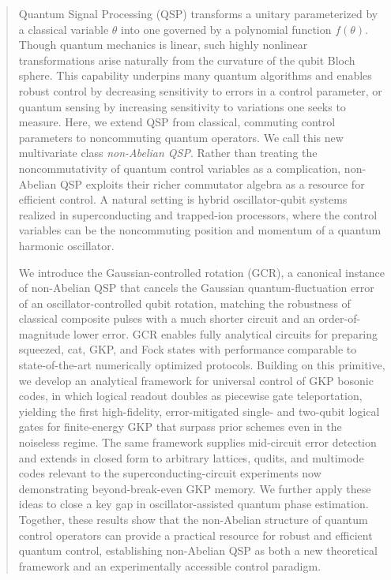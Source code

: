 \documentclass[aps,prx,showpacs,notitlepage,twocolumn,superscriptaddress,nofootinbib,preprintnumbers,floatfix,10pt, longbibliography]{revtex4-2}
\begin{document}
\begin{abstract}
Quantum Signal Processing (QSP) transforms a unitary parameterized by a classical variable $\theta$ into one governed by a polynomial function $f(\theta)$. Though quantum mechanics is linear, such highly nonlinear transformations arise naturally from the curvature of the qubit Bloch sphere. This capability underpins many quantum algorithms and enables robust control by decreasing sensitivity to errors in a control parameter, or quantum sensing by increasing sensitivity to variations one seeks to measure. Here, we extend QSP from classical, commuting control parameters to noncommuting quantum operators. We call this new multivariate class \emph{non-Abelian QSP}. Rather than treating the noncommutativity of quantum control variables as a complication, non-Abelian QSP exploits their richer commutator algebra as a resource for efficient control. A natural setting is hybrid oscillator-qubit systems realized in superconducting and trapped-ion processors, where the control variables can be the noncommuting position and momentum of a quantum harmonic oscillator. 

We introduce the Gaussian-controlled rotation (GCR), a canonical instance of non-Abelian QSP that cancels the Gaussian quantum-fluctuation error of an oscillator-controlled qubit rotation, matching the robustness of classical composite pulses with a much shorter circuit and an order-of-magnitude lower error. GCR enables fully analytical circuits for preparing squeezed, cat, GKP, and Fock states with performance comparable to state-of-the-art numerically optimized protocols. Building on this primitive, we develop an analytical framework for universal control of GKP bosonic codes, in which logical readout doubles as piecewise gate teleportation, yielding the first high-fidelity, error-mitigated single- and two-qubit logical gates for finite-energy GKP that surpass prior schemes even in the noiseless regime. The same framework supplies mid-circuit error detection and extends in closed form to arbitrary lattices, qudits, and multimode codes relevant to the superconducting-circuit experiments now demonstrating beyond-break-even GKP memory. We further apply these ideas to close a key gap in oscillator-assisted quantum phase estimation. Together, these results show that the non-Abelian structure of quantum control operators can provide a practical resource for robust and efficient quantum control, establishing non-Abelian QSP as both a new theoretical framework and an experimentally accessible control paradigm.
\end{abstract}
\maketitle
\makeatletter
\def\l@subsubsection#1#2{}
\makeatother
\setcounter{tocdepth}{1}
\end{document}
